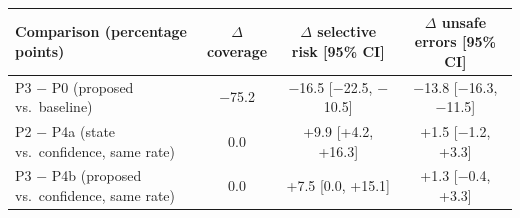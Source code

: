 \begin{tabular}{@{}lccc@{}}
\toprule
Comparison (percentage points) & $\Delta$ coverage & $\Delta$ selective risk [95\% CI] & $\Delta$ unsafe errors [95\% CI] \\
\midrule
P3 $-$ P0 (proposed vs.\ baseline) & $-$75.2 & $-$16.5 [$-$22.5, $-$10.5] & $-$13.8 [$-$16.3, $-$11.5] \\
P2 $-$ P4a (state vs.\ confidence, same rate) & 0.0 & +9.9 [+4.2, +16.3] & +1.5 [$-$1.2, +3.3] \\
P3 $-$ P4b (proposed vs.\ confidence, same rate) & 0.0 & +7.5 [0.0, +15.1] & +1.3 [$-$0.4, +3.3] \\
\bottomrule
\end{tabular}
